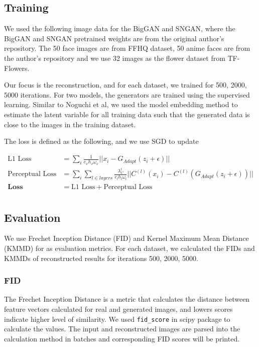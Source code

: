 \documentclass{article}
\begin{document}
    \subsection{Training}
    We used the following image data for the BigGAN and SNGAN, where the BigGAN and SNGAN pretrained weights are from the original author's repository. The 50 face images are from FFHQ dataset, 50 anime faces are from the author's repository and we use 32 images as the flower dataset from TF-Flowers.
    
    Our focus is the reconstruction, and for each dataset, we trained for 500, 2000, 5000 iterations. For two models, the generators are trained using the supervised learning. Similar to Noguchi et al, we used the model embedding method to estimate the latent variable for all training data such that the generated data is close to the images in the training dataset. 
    
    The loss is defined as the following, and we use SGD to update
    \begin{center}
        \begin{align*}
            \text{L1 Loss} & = \sum\limits_i \frac{1}{c_xh_x\omega_x} ||x_i-G_{Adapt}(z_i+\epsilon)||\\
            \text{Perceptual Loss} & = \sum\limits_i\sum\limits_{l\in layers} \frac{\lambda_C^l}{c_lh_l\omega_l} ||C^{(l)}(x_i)-C^{(l)}(G_{Adapt}(z_i+\epsilon))|| \\
            \textbf{Loss} & = \text{L1 Loss} + \text{Perceptual Loss} \\
        \end{align*}
    \end{center}
    
    \subsection{Evaluation}
    We use Frechet Inception Distance (FID) and Kernel Maximum Mean Distance (KMMD) for as evaluation metrics. For each dataset, we calculated the FIDs and KMMDs of reconstructed results for iterations 500, 2000, 5000.
    
    \subsubsection{FID}
    The Frechet Inception Distance is a metric that calculates the distance between feature vectors calculated for real and generated images, and lowers scores indicate higher level of similarity. We used \verb+fid_score+ in scipy package to calculate the values. The input and reconstructed images are parsed into the calculation method in batches and corresponding FID scores will be printed.
    
\end{document}
